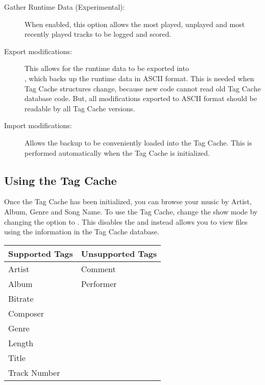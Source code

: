 \begin{description}
\item[Gather Runtime Data (Experimental):  ]
  When enabled, this option allows the most played, unplayed and most recently
  played tracks to be logged and scored.
  
\item[Export modifications:  ]
  This allows for the runtime data to be exported into \\
  , which backs up the runtime data in
  ASCII format. This is needed when Tag Cache structures change, because new
  code cannot read old Tag Cache database code. But, all modifications
  exported to ASCII format should be readable by all Tag Cache versions.
  
\item[Import modifications:  ]
  Allows the  backup to be 
  conveniently loaded into the Tag Cache. This is performed automatically when
  the Tag Cache is initialized.
  
\end{description}

\subsection{Using the Tag Cache}
Once the Tag Cache has been initialized, you can browse your music by Artist, 
Album, Genre and Song Name. To use the Tag Cache, change the 
 show mode by changing the  option to 
. This disables the  and instead
allows you to view files using the information in the Tag Cache database.\\

%
\begin{table}
\begin{center}
  \begin{tabularx}{.75\textwidth}{XX}
  \toprule
  Supported Tags   & Unsupported Tags \\ 
  \midrule
  Artist           & Comment \\
  Album            & Performer\\
  Bitrate          & \\
  Composer         & \\
  Genre            & \\
  Length           & \\
  Title            & \\
  Track Number     & \\
  \bottomrule
  \end{tabularx}
\end{center}
\end{table}
